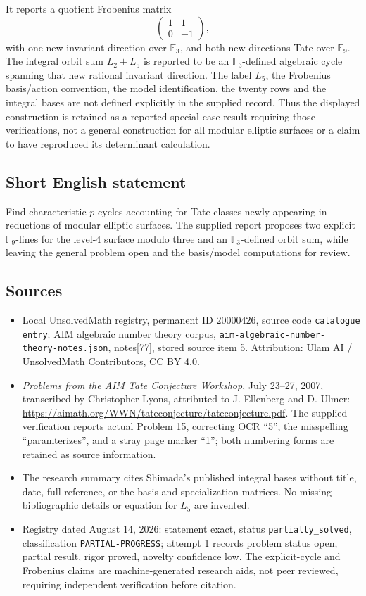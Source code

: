 \documentclass[11pt]{article}
\newcommand{\F}{\mathbb{F}}
\begin{document}
It reports a quotient Frobenius matrix
\[
 \begin{pmatrix}1&1\\0&-1\end{pmatrix},
\]
with one new invariant direction over \(\F_3\), and both new directions Tate over \(\F_9\). The integral orbit sum \(L_2+L_5\) is reported to be an \(\F_3\)-defined algebraic cycle spanning that new rational invariant direction. The label \(L_5\), the Frobenius basis/action convention, the model identification, the twenty rows and the integral bases are not defined explicitly in the supplied record. Thus the displayed construction is retained as a reported special-case result requiring those verifications, not a general construction for all modular elliptic surfaces or a claim to have reproduced its determinant calculation.
\subsection{Short English statement}
Find characteristic-\(p\) cycles accounting for Tate classes newly appearing in reductions of modular elliptic surfaces. The supplied report proposes two explicit \(\F_9\)-lines for the level-4 surface modulo three and an \(\F_3\)-defined orbit sum, while leaving the general problem open and the basis/model computations for review.
\subsection{Sources}
\begin{itemize}
\item Local UnsolvedMath registry, permanent ID \(20000426\), source code \texttt{catalogue entry}; AIM algebraic number theory corpus, \texttt{aim-algebraic-number-theory-notes.json}, notes[77], stored source item 5. Attribution: Ulam AI / UnsolvedMath Contributors, CC BY 4.0.
\item \emph{Problems from the AIM Tate Conjecture Workshop}, July 23--27, 2007, transcribed by Christopher Lyons, attributed to J. Ellenberg and D. Ulmer: \url{https://aimath.org/WWN/tateconjecture/tateconjecture.pdf}. The supplied verification reports actual Problem 15, correcting OCR ``5'', the misspelling ``paramterizes'', and a stray page marker ``1''; both numbering forms are retained as source information.
\item The research summary cites Shimada's published integral bases without title, date, full reference, or the basis and specialization matrices. No missing bibliographic details or equation for \(L_5\) are invented.
\item Registry dated August 14, 2026: statement exact, status \texttt{partially\_solved}, classification \texttt{PARTIAL-PROGRESS}; attempt 1 records problem status open, partial result, rigor proved, novelty confidence low. The explicit-cycle and Frobenius claims are machine-generated research aids, not peer reviewed, requiring independent verification before citation.
\end{itemize}
\end{document}
